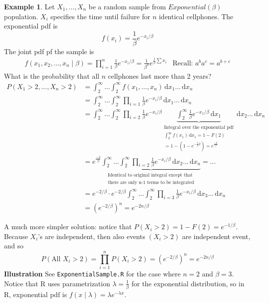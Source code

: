 \documentclass[10pt, twoside, a4paper]{book}
\newcommand{\ud}{\,\mathrm{d}}
\theoremstyle{definition}
\newtheorem{example}{Example}[chapter]
\begin{document}
\begin{example}
Let $X_1,\ldots,X_n$ be a random sample from $Exponential(\beta)$ population.
$X_i$ specifies the time until failure for $n$ identical cellphones. The
exponential pdf is
$$f(x_i) = \frac{1}{\beta}e^{-x_i/\beta}$$ %
The joint pdf pf the sample is
\begin{equation*}
\renewcommand{\arraystretch}{1.6}
\begin{array}{ll}
f(x_1, x_2, \ldots, x_n \mid \beta) = \prod_{i=1}^n
\frac{1}{\beta}e^{-x_i/\beta} = \frac{1}{\beta^n}e^{\frac{1}{\beta}\sum x_i} &
\text{Recall: } a^ba^c=a^{b+c}
\end{array}
\end{equation*}
What is the probability that all $n$ cellphones last more than 2 years?
\begin{equation*}
\renewcommand{\arraystretch}{1.6}
\begin{array}{ll}
P(X_1>2,\ldots,X_n>2) & = \int_2^\infty \ldots \int_2^\infty f(x_1,\ldots,x_n)
\ud x_1 \ldots \ud x_n \\
& = \int_2^\infty \ldots \int_2^\infty \prod_{i=1} \frac{1}{\beta}e^{-x_i/\beta}
\ud x_1 \ldots \ud x_n \\
& = \int_2^\infty \ldots \int_2^\infty \prod_{i=2} \frac{1}{\beta}e^{-x_i/\beta}
\underbrace{\int_2^\infty \frac{1}{\beta}e^{-x_1/\beta} \ud x_1}_{
\substack{
\text{Integral over the exponential pdf}\\
\int_2^\infty f(x_1) \ud
x_1 = 1 - F(2) \\ =
1-(1-e^{-\frac{1}{\beta}2}) = e^{\frac{-2}{\beta}}}} \ud x_2 \ldots \ud x_n
\\ %
& = e^{\frac{-2}{\beta}}\underbrace{\int_2^\infty \ldots \int_2^\infty
\prod_{i=2} \frac{1}{\beta}e^{-x_i/\beta} \ud x_2 \ldots \ud
x_n}_{\substack{\text{Identical to original integral except that} \\
\text{there are only n-1 terms to be integrated}}} =
\ldots
\\
& = e^{-2/\beta}\cdot e^{-2/\beta} \int_2^\infty \ldots \int_2^\infty
\prod_{i=3} \frac{1}{\beta}e^{-x_i/\beta} \ud x_3 \ldots \ud x_n \\
& = (e^{-2/\beta})^n = e^{-2n/\beta}
\end{array}
\end{equation*}
\end{example}
A much more simpler solution: notice that $P(X_i > 2) = 1 - F(2) =
e^{-1/\beta}$. Because $X_i$'s are independent, then also events $(X_i > 2)$ are
independent event, and so
$$P(\text{All } X_i > 2) = \prod_{i=1}^n P(X_i > 2) = (e^{-2/\beta})^n =
e^{-2n/\beta}$$
\textbf{Illustration} See \verb#ExponentialSample.R# for the case where $n=2$
and $\beta=3$. Notice that R uses parametrization $\lambda=\frac{1}{\beta}$
for the exponential distribution, so in R, exponential pdf is $f(x \mid
\lambda) = \lambda e^{-\lambda x}$.
\end{document}
